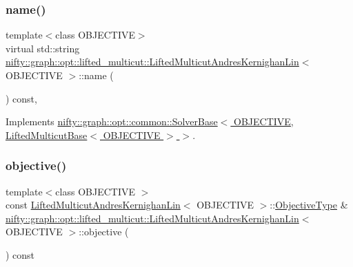 \subsubsection{\texorpdfstring{name()}{name()}}
{\footnotesize\ttfamily template$<$class O\+B\+J\+E\+C\+T\+I\+VE$>$ \\
virtual std\+::string \hyperlink{classnifty_1_1graph_1_1opt_1_1lifted__multicut_1_1LiftedMulticutAndresKernighanLin}{nifty\+::graph\+::opt\+::lifted\+\_\+multicut\+::\+Lifted\+Multicut\+Andres\+Kernighan\+Lin}$<$ O\+B\+J\+E\+C\+T\+I\+VE $>$\+::name (\begin{DoxyParamCaption}{ }\end{DoxyParamCaption}) const\hspace{0.3cm}{\ttfamily [inline]}, {\ttfamily [virtual]}}



Implements \hyperlink{classnifty_1_1graph_1_1opt_1_1common_1_1SolverBase_af638b9a804cfec3e35fe87c77e942d30}{nifty\+::graph\+::opt\+::common\+::\+Solver\+Base$<$ O\+B\+J\+E\+C\+T\+I\+V\+E, Lifted\+Multicut\+Base$<$ O\+B\+J\+E\+C\+T\+I\+V\+E $>$ $>$}.

\mbox{\label{classnifty_1_1graph_1_1opt_1_1lifted__multicut_1_1LiftedMulticutAndresKernighanLin_a7e315a8fb58cfb031cd17acadfe09bfe}} 
\subsubsection{\texorpdfstring{objective()}{objective()}}
{\footnotesize\ttfamily template$<$class O\+B\+J\+E\+C\+T\+I\+VE $>$ \\
const \hyperlink{classnifty_1_1graph_1_1opt_1_1lifted__multicut_1_1LiftedMulticutAndresKernighanLin}{Lifted\+Multicut\+Andres\+Kernighan\+Lin}$<$ O\+B\+J\+E\+C\+T\+I\+VE $>$\+::\hyperlink{classnifty_1_1graph_1_1opt_1_1lifted__multicut_1_1LiftedMulticutAndresKernighanLin_a31b45ec18fa430d4f6231a60395b4b14}{Objective\+Type} \& \hyperlink{classnifty_1_1graph_1_1opt_1_1lifted__multicut_1_1LiftedMulticutAndresKernighanLin}{nifty\+::graph\+::opt\+::lifted\+\_\+multicut\+::\+Lifted\+Multicut\+Andres\+Kernighan\+Lin}$<$ O\+B\+J\+E\+C\+T\+I\+VE $>$\+::objective (\begin{DoxyParamCaption}{ }\end{DoxyParamCaption}) const\hspace{0.3cm}{\ttfamily [virtual]}}




